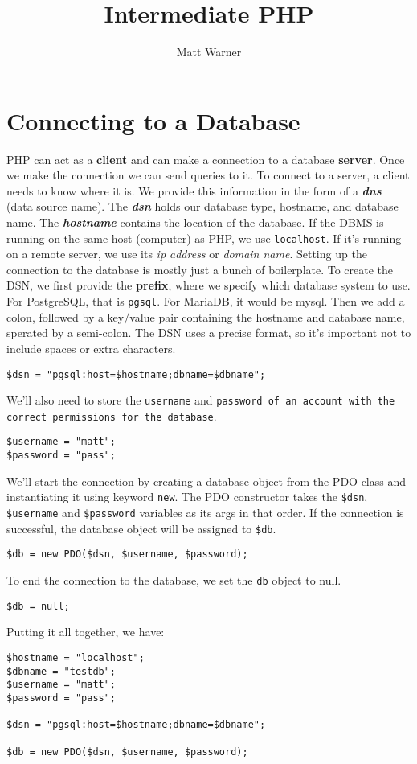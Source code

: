 \documentclass{report}
\title{\Huge{Intermediate PHP}}
\author{\huge{Matt Warner}}
\date{\huge{}}
\begin{document}
    \maketitle
\section{Connecting to a Database}
PHP can act as a \textbf{client} and can make a connection to a database \textbf{server}. Once we make the connection we can send queries to it.
\bigbreak \noindent
To connect to a server, a client needs to know where it is. We provide this information in the form of a \textit{\textbf{dns}} (data source name). 
\bigbreak \noindent
The \textit{\textbf{dsn}} holds our database type, hostname, and database name. The \textit{\textbf{hostname}} contains the location of the database. If the DBMS is running on the same host (computer) as PHP, we use \texttt{localhost}. If it's running on a remote server, we use its \textit{ip address} or \textit{domain name}.  
\bigbreak \noindent
Setting up the connection to the database is mostly just a bunch of boilerplate. To create the DSN, we first provide the \textbf{prefix}, where we specify which database system to use. For PostgreSQL, that is \texttt{pgsql}. For MariaDB, it would be mysql. Then we add a colon, followed by a key/value pair containing the hostname and database name, sperated by a semi-colon. The DSN uses a precise format, so it's important not to include spaces or extra characters.
\begin{verbatim}
$dsn = "pgsql:host=$hostname;dbname=$dbname";
\end{verbatim}
We'll also need to store the \texttt{username} and \texttt{password of an account with the correct permissions for the database}.
\begin{verbatim}
$username = "matt";
$password = "pass";
\end{verbatim}
We'll start the connection by creating a database object from the PDO class and instantiating it using keyword \texttt{new}. The PDO constructor takes the \texttt{\$dsn}, \texttt{\$username} and \texttt{\$password} variables as its args in that order. If the connection is successful, the database object will be assigned to \texttt{\$db}.
\begin{verbatim}
$db = new PDO($dsn, $username, $password);
\end{verbatim}
To end the connection to the database, we set the \texttt{db} object to null.
\begin{verbatim}
$db = null;
\end{verbatim}
Putting it all together, we have:
\begin{verbatim}
$hostname = "localhost";
$dbname = "testdb";
$username = "matt";
$password = "pass";

$dsn = "pgsql:host=$hostname;dbname=$dbname";

$db = new PDO($dsn, $username, $password);
\end{verbatim}
\newpage
\end{document}

